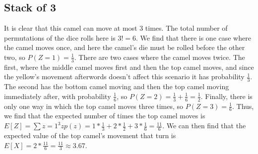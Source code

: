 \documentclass{article}
\begin{document}
\subsection{Stack of 3}
 It is clear that this camel can move at most $3$ times. The total number of permutations of the dice rolls here is $3! = 6$. We find that there is one case where the camel moves once, and here the camel's die must be rolled before the other two, so $P(Z=1) = \frac{1}{3}$. There are two cases where the camel moves twice. The first, where the middle camel moves first and then the top camel moves, and since the yellow's movement afterwords doesn't affect this scenario it has probability $\frac{1}{3}$. The second has the bottom camel moving and then the top camel moving immediately after, with probability $\frac{1}{6}$, so $P(Z=2) = \frac{1}{3} + \frac{1}{6} = \frac{1}{2}$. Finally, there is only one way in which the top camel moves three times, so $P(Z = 3) = \frac{1}{6}$. Thus, we find that the expected number of times the top camel moves is $E[Z] = \sum{z=1}^{3}zp(z) =1*\frac{1}{3} + 2*\frac{1}{2} + 3*\frac{1}{6} = \frac{11}{6}$. We can then find that the expected value of the top camel's movement that turn is $E[X]=2*\frac{11}{6} = \frac{11}{3} \approx 3.67$.
\end{document}
